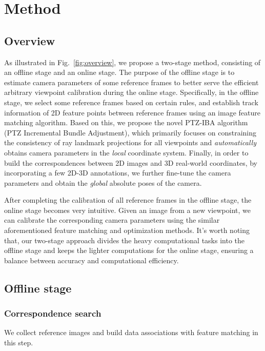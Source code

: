 \section{Method}

\subsection{Overview}

As illustrated in Fig.~\ref{fig:overview}, we propose a two-stage method, consisting of an offline stage and an online stage. The purpose of the offline stage is to estimate camera parameters of some reference frames to better serve the efficient arbitrary viewpoint calibration during the online stage. Specifically, in the offline stage, we select some reference frames based on certain rules, and establish track information of 2D feature points between reference frames using an image feature matching algorithm. Based on this, we propose the novel PTZ-IBA algorithm (PTZ Incremental Bundle Adjustment), which primarily focuses on constraining the consistency of ray landmark projections for all viewpoints and \textit{automatically} obtains camera parameters in the \textit{local} coordinate system. 
Finally, in order to build the correspondences between 2D images and 3D real-world coordinates, by incorporating a few 2D-3D annotations, we further fine-tune the camera parameters and obtain the \textit{global} absolute poses of the camera.

After completing the calibration of all reference frames in the offline stage, the online stage becomes very intuitive. Given an image from a new viewpoint, we can calibrate the corresponding camera parameters using the similar aforementioned feature matching and optimization methods. It's worth noting that, our two-stage approach divides the heavy computational tasks into the offline stage and keeps the lighter computations for the online stage, ensuring a balance between accuracy and computational efficiency.


\subsection{Offline stage}

\subsubsection{Correspondence search}
We collect reference images and build data associations with feature matching in this step.


